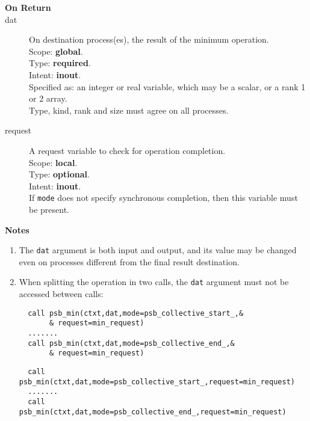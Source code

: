 \begin{description}
\item[\bf On Return]
\item[dat] On destination process(es), the result of the minimum operation.\\
Scope: {\bf global}.\\
Type: {\bf required}.\\
Intent: {\bf inout}.\\
Specified as: an integer  or  real variable, which may be a
scalar, or a rank 1 or 2 array. \\
Type, kind, rank and size must agree on all processes.
\item[request] A request variable to check for operation completion.\\
Scope: {\bf local}.\\
Type: {\bf optional}.\\
Intent: {\bf inout}.\\
If \verb|mode| does not specify synchronous completion, then this
variable must be present.
\end{description}


{\par\noindent\large\bfseries Notes}
\begin{enumerate}
\item The \verb|dat| argument is both input and output, and its
  value may be changed even on processes different from the final
  result destination.
\item When splitting the operation in two calls, the \verb|dat|
  argument  must not be accessed between calls:
\ifpdf
\begin{verbatim}
  call psb_min(ctxt,dat,mode=psb_collective_start_,&
       & request=min_request)
  .......
  call psb_min(ctxt,dat,mode=psb_collective_end_,&
       & request=min_request)
\end{verbatim}
\else
\begin{center}
    \begin{minipage}[tl]{0.9\textwidth}
\begin{verbatim} 
  call psb_min(ctxt,dat,mode=psb_collective_start_,request=min_request)
  .......
  call psb_min(ctxt,dat,mode=psb_collective_end_,request=min_request)
\end{verbatim}
    \end{minipage}
  \end{center}
\fi
\end{enumerate}

